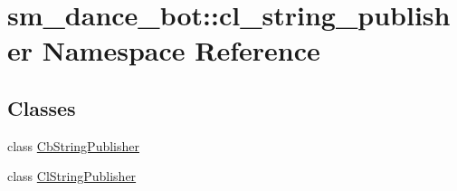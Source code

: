 \hypertarget{namespacesm__dance__bot_1_1cl__string__publisher}{}\section{sm\+\_\+dance\+\_\+bot\+:\+:cl\+\_\+string\+\_\+publisher Namespace Reference}
\label{namespacesm__dance__bot_1_1cl__string__publisher}
\subsection*{Classes}
\begin{DoxyCompactItemize}
\item 
class \hyperlink{classsm__dance__bot_1_1cl__string__publisher_1_1CbStringPublisher}{Cb\+String\+Publisher}
\item 
class \hyperlink{classsm__dance__bot_1_1cl__string__publisher_1_1ClStringPublisher}{Cl\+String\+Publisher}
\end{DoxyCompactItemize}
